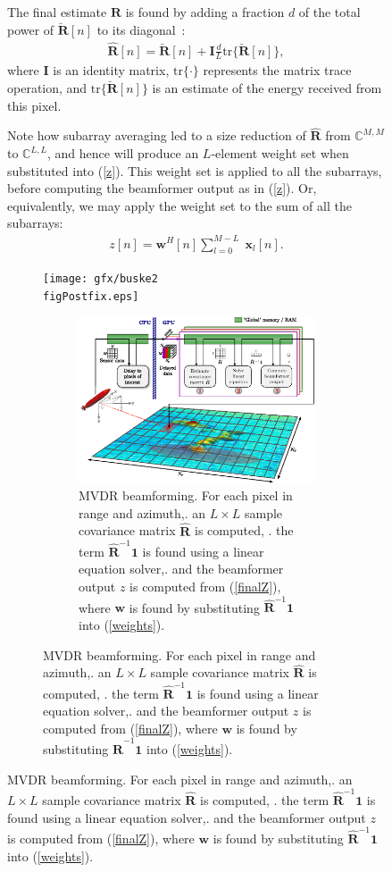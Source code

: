 \documentclass[12pt,journal,draftclsnofoot,onecolumn]{IEEEtran}
\let\MYoriglatexcaption\caption               %
\renewcommand{\caption}[2][\relax]{\MYoriglatexcaption[#2]{#2}}
\newcommand\tr{\text{tr}}
\newcommand\sumb[2]{\sum\limits_{#1}^{#2}\;}
\renewcommand\H{^{\scriptscriptstyle H}}
\renewcommand\vec[1]{\boldsymbol{#1}}
\newcommand\mat[1]{\boldsymbol{#1}}
\newcommand\1{\vec 1}
\newcommand\I{\mat I}
\newcommand*\w{\vec w}
\newcommand*\x{\vec x}
\newcommand*\R{\mat R}
\newcommand*\eR{\mat{\hat R}}
\begin{document}
\begin{figure}[H]
The final estimate $\eR$ is found by adding a fraction $d$ of the total power of $\breve{\R}[n]$ to its diagonal~\cite{Synnevag2007}:
\begin{align}
\eR[n] = \breve{\R}[n] + \I \frac{d}{L} \tr\{\breve{\R}[n]\},\label{finalR}
\end{align}
where $\I$ is an identity matrix, $\tr\{\cdot\}$ represents the matrix trace operation, and $\tr\{\breve{\R}[n]\}$ is an estimate of the energy received from this pixel.

Note how subarray averaging led to a size reduction of $\eR$ from $\mathbb{C}^{M,M}$ to $\mathbb{C}^{L,L}$, and hence will produce an $L$-element weight set when substituted into (\ref{z}). This weight set is applied to all the subarrays, before computing the beamformer output as in (\ref{z}). Or, equivalently, we may apply the weight set to the sum of all the subarrays:
\begin{align}
z[n] = \w\H[n] \sumb{l=0}{M-L} \x_l[n].\label{finalZ}
\end{align}
\ifPeerReview
\begin{figure}[!t]\centering
\texttt{[image: gfx/buske2\\figPostfix.eps]}
\else
\begin{figure}[!t]\centering
\includegraphics[width=\linewidth]{gfx/implementation.eps}
\fi%
\caption{MVDR beamforming. For each pixel in range and azimuth,\newline
1. an $L\times{}L$ sample covariance matrix $\eR$ is computed, \newline
2. the term $\eR^{-1}\1$ is found using a linear equation solver,\newline
3. and the beamformer output $z$ is computed from (\ref{finalZ}), where $\w$ is found by substituting $\eR^{-1}\1$ into (\ref{weights}). } \label{mvdr_beamforming}

\end{figure}
\end{figure}
\end{figure}
\end{document}
